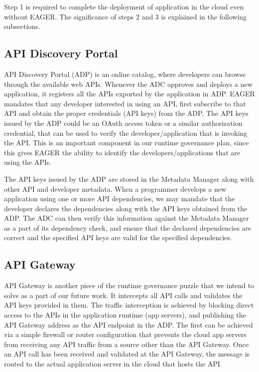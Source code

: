 Step 1 is required to complete the deployment of application in the cloud even without EAGER. The significance of steps 2 and 3 is explained in the 
following subsections.

\subsection{API Discovery Portal}
API Discovery Portal (ADP) is an online catalog, where developers can browse through the available web APIs. Whenever the ADC
approves and deploys a new application, it registers all the APIs exported by the application in ADP. 
EAGER mandates that any developer interested in using an API, first subscribe to that
API and obtain the proper credentials (API keys) from the ADP. The API keys issued by the ADP could be an OAuth access token or a similar authorization
credential, that can be used to verify the developer/application that is invoking the API. This is an important component in our runtime governance
plan, since this gives EAGER the ability to identify the developers/applications that are using the APIs. 

The API keys issued by the ADP are stored in the Metadata Manager along with other API and developer metadata. When a programmer develops a new application
using one or more API dependencies, we may mandate that the developer declares the dependencies along with the API keys obtained from the ADP. The ADC
can then verify this information against the Metadata Manager as a part of its dependency check, and ensure that the declared dependencies are correct and 
the specified API keys are valid for the specified dependencies. %

\subsection{API Gateway}
API Gateway is another piece of the runtime governance puzzle that we intend to solve as a part of our future work. It intercepts all API calls and validates the API
keys provided in them. The traffic interception is achieved by blocking direct access to the APIs in the application runtime (app servers), and publishing the API 
Gateway address as the API endpoint in the ADP. The first can be achieved via a simple firewall or router configuration that prevents the cloud app servers from 
receiving any API traffic from a source other than the API Gateway. Once an API call has been received and validated at the API Gateway, the message is
routed to the actual application server in the cloud that hosts the API.

